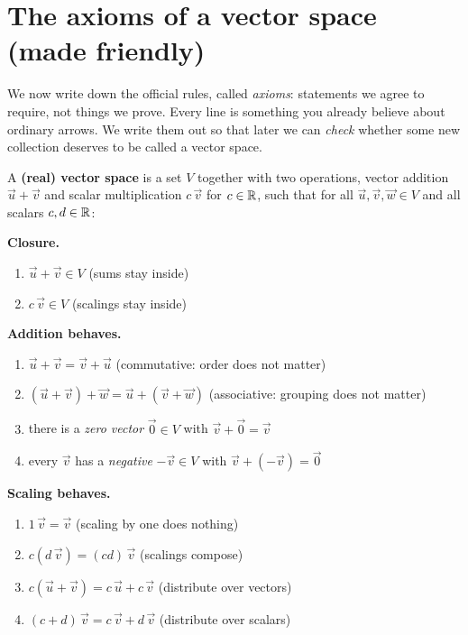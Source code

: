 \section{The axioms of a vector space (made friendly)}

We now write down the official rules, called \emph{axioms}: statements we agree to
require, not things we prove. Every line is
something you already believe about ordinary arrows. We write them out so
that later we can \emph{check} whether some new collection deserves to be called
a vector space.

\begin{formalbox}
A \textbf{(real) vector space} is a set $V$ together with two operations, vector
addition $\vec{u} + \vec{v}$ and scalar multiplication $c\,\vec{v}$ for $c \in \mathbb{R}$,
such that for all $\vec{u},\vec{v},\vec{w} \in V$ and all scalars $c,d \in \mathbb{R}$:

\smallskip
\textbf{Closure.}
\begin{enumerate}[label=(\arabic*)]
  \item $\vec{u} + \vec{v} \in V$ \hfill (sums stay inside)
  \item $c\,\vec{v} \in V$ \hfill (scalings stay inside)
\end{enumerate}

\textbf{Addition behaves.}
\begin{enumerate}[label=(\arabic*),start=3]
  \item $\vec{u} + \vec{v} = \vec{v} + \vec{u}$ \hfill (commutative: order does not matter)
  \item $(\vec{u} + \vec{v}) + \vec{w} = \vec{u} + (\vec{v} + \vec{w})$ \hfill (associative: grouping does not matter)
  \item there is a \emph{zero vector} $\vec{0}\in V$ with $\vec{v} + \vec{0} = \vec{v}$
  \item every $\vec{v}$ has a \emph{negative} $-\vec{v}\in V$ with $\vec{v} + (-\vec{v}) = \vec{0}$
\end{enumerate}

\textbf{Scaling behaves.}
\begin{enumerate}[label=(\arabic*),start=7]
  \item $1\,\vec{v} = \vec{v}$ \hfill (scaling by one does nothing)
  \item $c(d\,\vec{v}) = (cd)\,\vec{v}$ \hfill (scalings compose)
  \item $c(\vec{u} + \vec{v}) = c\,\vec{u} + c\,\vec{v}$ \hfill (distribute over vectors)
  \item $(c + d)\,\vec{v} = c\,\vec{v} + d\,\vec{v}$ \hfill (distribute over scalars)
\end{enumerate}
\end{formalbox}

